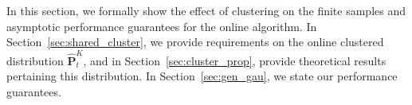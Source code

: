 \documentclass[12pt]{article}
\newcommand{\bnote}[1]{\textcolor{purple}{\textbf{[B: #1]}}}
\newcommand{\prob}{{\mathbf P}}
\newcommand{\epsnom}{\varepsilon}
\begin{document}



In this section, we formally show the effect of clustering on the finite samples and asymptotic performance guarantees for the online algorithm. 
% 
In Section~\ref{sec:shared_cluster}, we provide requirements on the online clustered distribution $\hat{\prob}^K_t$, and in Section~\ref{sec:cluster_prop}, provide theoretical results pertaining this distribution. 
In Section~\ref{sec:gen_gau}, we  state our performance guarantees. 

\end{document}
